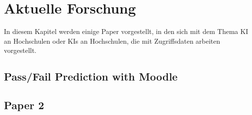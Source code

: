 \chapter{Aktuelle Forschung}
In diesem Kapitel werden einige Paper vorgestellt, in den sich mit dem Thema KI an Hochschulen oder KIs an Hochschulen, die mit Zugriffsdaten arbeiten vorgestellt.

\section{Pass/Fail Prediction with Moodle}

\section{Paper 2}